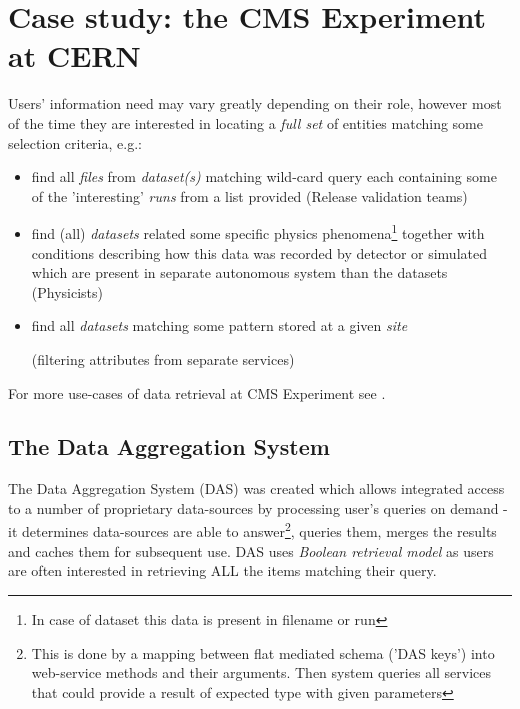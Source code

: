 \documentclass[a4paper,11pt,draft]{article}
\begin{document}
\section{Case study: the CMS Experiment at CERN}
Users' information need may vary greatly depending on their role, however most of the time they are interested in locating a \textit{full set} of entities matching some selection criteria, e.g.:
   \begin{itemize}
  		\item find all \textit{files} from \textit{dataset(s)} matching wild-card query each containing some of the 'interesting' \textit{runs} from a list provided (Release validation teams)
         \item find (all) \textit{datasets} related some specific physics phenomena\footnote{In case of dataset this data is present in filename or run} together with conditions describing how this data was recorded by detector or simulated which are present in separate autonomous system than the datasets (Physicists)
         \item find all \textit{datasets} matching some pattern stored at a given \textit{site} 
         	  \begin{small}(filtering attributes from separate services)\end{small}
   \end{itemize}                		

For more use-cases of data retrieval at CMS Experiment see \cite{CMS_data08}.


\subsection*{The Data Aggregation System}

The Data Aggregation System (DAS)\cite{Kuznetsov2010, Kuznetsov2011} was created which allows integrated access to a number of proprietary data-sources by processing user's queries on demand - it determines  data-sources are able to answer\footnote{This is done by a mapping between flat mediated schema ('DAS keys') into web-service methods and their arguments. Then system queries all services that could provide a result of expected type with given parameters}, queries them, merges the results and caches them for subsequent use. DAS uses \textit{Boolean retrieval model} as users are often interested in retrieving ALL the items matching their query.
\end{document}
